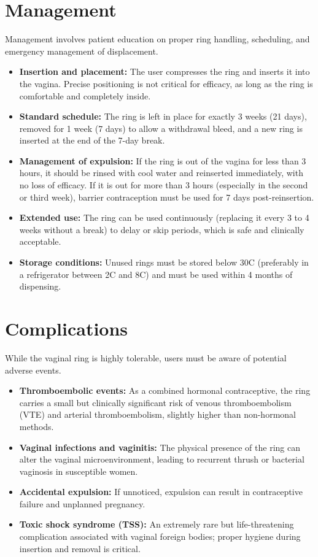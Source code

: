 \section*{Management}
Management involves patient education on proper ring handling, scheduling, and emergency management of displacement.
\begin{itemize}
    \item \textbf{Insertion and placement:} The user compresses the ring and inserts it into the vagina. Precise positioning is not critical for efficacy, as long as the ring is comfortable and completely inside.
    \item \textbf{Standard schedule:} The ring is left in place for exactly 3 weeks (21 days), removed for 1 week (7 days) to allow a withdrawal bleed, and a new ring is inserted at the end of the 7-day break.
    \item \textbf{Management of expulsion:} If the ring is out of the vagina for less than 3 hours, it should be rinsed with cool water and reinserted immediately, with no loss of efficacy. If it is out for more than 3 hours (especially in the second or third week), barrier contraception must be used for 7 days post-reinsertion.
    \item \textbf{Extended use:} The ring can be used continuously (replacing it every 3 to 4 weeks without a break) to delay or skip periods, which is safe and clinically acceptable.
    \item \textbf{Storage conditions:} Unused rings must be stored below 30\textdegree C (preferably in a refrigerator between 2\textdegree C and 8\textdegree C) and must be used within 4 months of dispensing.
\end{itemize}

\section*{Complications}
While the vaginal ring is highly tolerable, users must be aware of potential adverse events.
\begin{itemize}
    \item \textbf{Thromboembolic events:} As a combined hormonal contraceptive, the ring carries a small but clinically significant risk of venous thromboembolism (VTE) and arterial thromboembolism, slightly higher than non-hormonal methods.
    \item \textbf{Vaginal infections and vaginitis:} The physical presence of the ring can alter the vaginal microenvironment, leading to recurrent thrush or bacterial vaginosis in susceptible women.
    \item \textbf{Accidental expulsion:} If unnoticed, expulsion can result in contraceptive failure and unplanned pregnancy.
    \item \textbf{Toxic shock syndrome (TSS):} An extremely rare but life-threatening complication associated with vaginal foreign bodies; proper hygiene during insertion and removal is critical.
\end{itemize}

